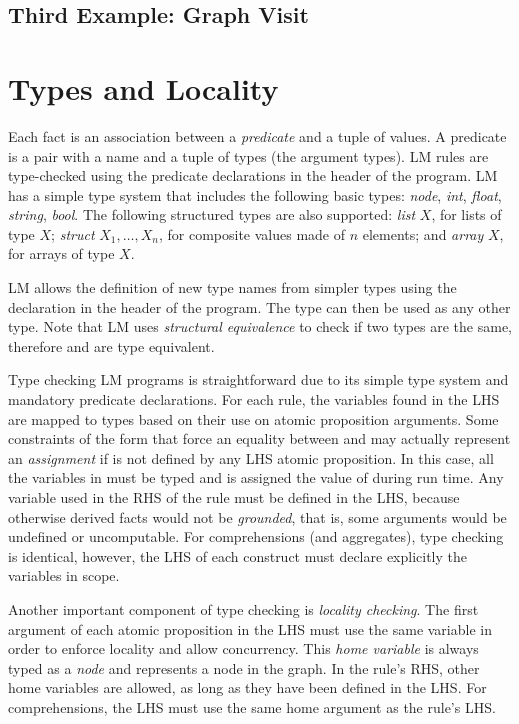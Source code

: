 \subsection{Third Example: Graph Visit}


\section{Types and Locality}

Each fact is an association between a \emph{predicate} and a tuple of values. A
predicate is a pair with a name and a tuple of types (the argument types). LM
rules are type-checked using the predicate declarations in the header of the
program. LM has a simple type system that includes the following basic types:
\emph{node}, \emph{int}, \emph{float}, \emph{string}, \emph{bool}. The following
structured types are also supported: \emph{list} $X$, for lists of type $X$;
\emph{struct} $X_1, \ldots, X_n$, for composite values made of $n$ elements; and
\emph{array} $X$, for arrays of type $X$.

LM allows the definition of new type names from simpler types using the
declaration  in the header of the program. The
type  can then be used as any other type. Note that LM uses
\emph{structural equivalence} to check if two types are the same, therefore
 and  are type equivalent.

Type checking LM programs is straightforward due to its simple type system and
mandatory predicate declarations. For each rule, the variables found in the LHS
are mapped to types based on their use on atomic proposition arguments. Some
constraints of the form  that force an equality between
 and  may actually represent an \emph{assignment} if
 is not defined by any LHS atomic proposition. In this case, all the
variables in  must be typed and  is assigned the value
of  during run time.  Any variable used in the RHS of the rule
must be defined in the LHS, because otherwise derived facts would not be
\emph{grounded}, that is, some arguments would be undefined or uncomputable.
For comprehensions (and aggregates), type checking is identical, however, the LHS
of each construct must declare explicitly the variables in scope.

Another important component of type checking is \emph{locality checking}. The
first argument of each atomic proposition in the LHS must use the same variable
in order to enforce locality and allow concurrency. This \emph{home variable} is
always typed as a \emph{node} and represents a node in the graph. In the rule's
RHS, other home variables are allowed, as long as they have been defined in the
LHS. For comprehensions, the LHS must use the same home argument as the rule's
LHS.

